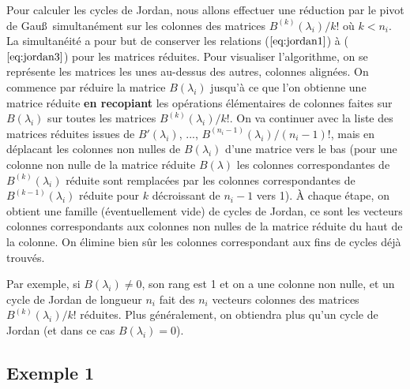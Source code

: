 \documentclass[a4paper,11pt]{book}
\begin{document}
\begin{giacjshere}
Pour calculer les cycles de Jordan, nous allons effectuer une
r\'eduction par le pivot de Gau\ss\ simultan\'ement sur les colonnes
des matrices $B^{(k)}(\lambda _i)/k!$ o\`u $k<n_i$. 
La simultan\'eit\'e a pour but de conserver les
relations (\(\ref{eq:jordan1}\)) \`a (\(\ref{eq:jordan3}\)) pour les matrices
r\'eduites. Pour visualiser l'algorithme, on se repr\'esente les
matrices les unes au-dessus des autres, colonnes align\'ees.
On commence par r\'eduire la matrice $B(\lambda _i)$ jusqu'\`a ce
que l'on obtienne une matrice r\'eduite {\bf en recopiant} les op\'erations
\'el\'ementaires de colonnes faites sur $B(\lambda _i)$ sur toutes les matrices
$B^{(k)}(\lambda _i)/k!$. On va continuer avec la liste des matrices
r\'eduites issues de $B'(\lambda _i)$, ..., 
$B^{(n_i-1)}(\lambda _i)/(n_i-1)!$, 
mais en d\'eplacant les colonnes non nulles de $B(\lambda _i)$ 
d'une matrice vers le bas
(pour une colonne non nulle de la matrice r\'eduite $B(\lambda )$
les colonnes correspondantes de $B^{(k)}(\lambda _i)$ r\'eduite 
sont remplac\'ees par les colonnes correspondantes de $B^{(k-1)}(\lambda _i)$
r\'eduite pour $k$ d\'ecroissant de $n_i-1$ vers 1).
\`A chaque \'etape, on obtient une famille (\'eventuellement vide)
de cycles de Jordan, ce sont les vecteurs colonnes correspondants 
aux colonnes non nulles de la matrice r\'eduite du haut de la colonne.
On \'elimine bien s\^ur les colonnes correspondant aux fins de cycles
d\'ej\`a trouv\'es.

Par exemple, si $B(\lambda _i)\neq 0$, son rang est 1 et on a
une colonne non nulle, et un cycle de Jordan de longueur
$n_i$ fait des $n_i$ vecteurs colonnes des matrices
$B^{(k)}(\lambda _i)/k!$ r\'eduites. 
Plus g\'en\'eralement, on obtiendra plus qu'un cycle de Jordan
(et dans ce cas $B(\lambda _i)= 0$).


\subsection{Exemple 1} \label{sec:ex1}


\end{giacjshere}
\end{document}
